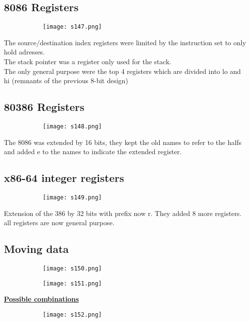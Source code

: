 \documentclass[8pt]{extreport}
\begin{document}
\subsection{8086 Registers}
\begin{figure}[H]
\centering
\begin{subfigure}[b]{0.4\linewidth}
\texttt{[image: s147.png]}
\end{subfigure}
\end{figure}
The source/destination index registers were limited by the instruction set to only hold adresses.\\
The stack pointer was a register only used for the stack.\\
The only general purpose were the top 4 registers which are divided into lo and hi (remnants of the previous 8-bit design)
\subsection{80386 Registers}
\begin{figure}[H]
\centering
\begin{subfigure}[b]{0.4\linewidth}
\texttt{[image: s148.png]}
\end{subfigure}
\end{figure}
The 8086 was extended by 16 bits, they kept the old names to refer to the halfs and added e to the names to indicate the extended register.

\subsection{x86-64 integer registers}
\begin{figure}[H]
\centering
\begin{subfigure}[b]{0.4\linewidth}
\texttt{[image: s149.png]}
\end{subfigure}
\end{figure}
Extension of the 386 by 32 bits with prefix now r. They added 8 more registers. all registers are now general purpose.

\subsection{Moving data}
\begin{figure}[H]
\centering
\begin{subfigure}[b]{0.4\linewidth}
\texttt{[image: s150.png]}
\end{subfigure}
\begin{subfigure}[b]{0.4\linewidth}
\texttt{[image: s151.png]}
\end{subfigure}
\end{figure}
\underline{\textbf{Possible combinations}}
\begin{figure}[H]
\centering
\begin{subfigure}[b]{0.4\linewidth}
\texttt{[image: s152.png]}
\end{subfigure}
\end{figure}
\end{document}
